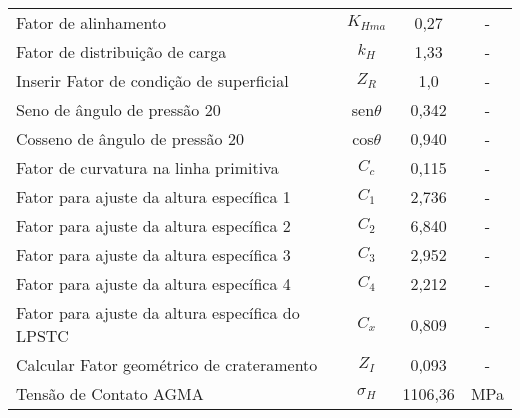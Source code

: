 \begin{table}[!htb]
\begin{tabular}{l c c c}
Fator de alinhamento                                                                                                         & $K_{Hma}$           & 0,27           & -             \\
Fator de distribuição de carga                                                                                               & $k_H$             & 1,33           & -             \\
Inserir Fator de condição de superficial                                                                                     & $Z_R$             & 1,0              & -             \\
Seno de ângulo de pressão 20                                                                                                 & sen$\theta$           & 0,342          & -             \\
Cosseno de ângulo de pressão 20                                                                                              & cos$\theta$           & 0,940          & -             \\
Fator de curvatura na linha primitiva                                                                                        & $C_c$             & 0,115          & -             \\
Fator para ajuste da altura específica 1                                                                                     & $C_1$             & 2,736          & -             \\
Fator para ajuste da altura específica 2                                                                                     & $C_2$             & 6,840          & -             \\
Fator para ajuste da altura específica 3                                                                                     & $C_3$             & 2,952          & -             \\
Fator para ajuste da altura específica 4                                                                                     & $C_4$             & 2,212          & -             \\
Fator para ajuste da altura específica do LPSTC                                                                              & $C_x$             & 0,809          & -             \\
Calcular Fator geométrico de crateramento                                                                                    & $Z_I$             & 0,093          & -             \\
Tensão de Contato AGMA                                                                                                       & $\sigma_H$              & 1106,36        & MPa             \\ \hline  
\end{tabular}
\end{table}